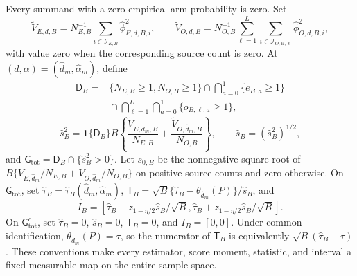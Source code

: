Every summand with a zero empirical arm probability is zero. Set
\[
 \widetilde V_{E,d,B}=N_{E,B}^{-1}\sum_{i\in\mathcal I_{E,B}}\widehat\phi_{E,d,B,i}^2,
 \qquad
 \widetilde V_{O,d,B}=N_{O,B}^{-1}\sum_{\ell=1}^L\sum_{i\in\mathcal I_{O,B,\ell}}\widehat\phi_{O,d,B,i}^2,
\]
with value zero when the corresponding source count is zero. At \((d,\alpha)=(\widehat d_m,\widehat\alpha_m)\), define
\[
\begin{aligned}
 \mathsf D_B
 ={}&\{N_{E,B}\ge1,N_{O,B}\ge1\}
 \cap\bigcap_{a=0}^1\{e_{B,a}\ge1\}\\
 &{}\cap\bigcap_{\ell=1}^L\bigcap_{a=0}^1\{o_{B,\ell,a}\ge1\},
\end{aligned}
\]
\[
 \widehat s_B^2=\mathbf 1\{\mathsf D_B\}B\left\{
 \frac{\widetilde V_{E,\widehat d_m,B}}{N_{E,B}}
 +\frac{\widetilde V_{O,\widehat d_m,B}}{N_{O,B}}\right\},
 \qquad
 \widehat s_B=(\widehat s_B^2)^{1/2},
\]
and \(\mathsf G_{\mathrm{tot}}=\mathsf D_B\cap\{\widehat s_B^2>0\}\). Let \(s_{0,B}\) be the nonnegative square root of \(B\{V_{E,\widehat d_m}/N_{E,B}+V_{O,\widehat d_m}/N_{O,B}\}\) on positive source counts and zero otherwise. On \(\mathsf G_{\mathrm{tot}}\), set \(\widehat\tau_B=\widehat\tau_B(\widehat d_m,\widehat\alpha_m)\), \(\mathsf T_B=\sqrt B\{\widehat\tau_B-\theta_{\widehat d_m}(P)\}/\widehat s_B\), and
\[
 I_B=\left[\widehat\tau_B-z_{1-\eta/2}\widehat s_B/\sqrt B,
 \widehat\tau_B+z_{1-\eta/2}\widehat s_B/\sqrt B\right].
\]
On \(\mathsf G_{\mathrm{tot}}^c\), set \(\widehat\tau_B=0\), \(\widehat s_B=0\), \(\mathsf T_B=0\), and \(I_B=[0,0]\). Under common identification, \(\theta_{\widehat d_m}(P)=\tau\), so the numerator of \(\mathsf T_B\) is equivalently \(\sqrt B(\widehat\tau_B-\tau)\). These conventions make every estimator, score moment, statistic, and interval a fixed measurable map on the entire sample space.